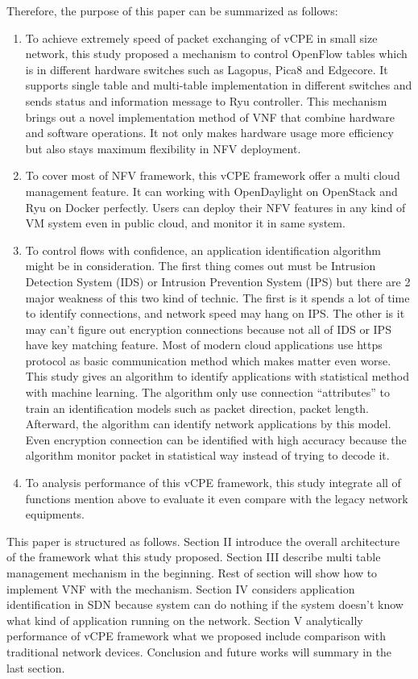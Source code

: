\documentclass[journal]{IEEEtran}
\begin{document}
Therefore, the purpose of this paper can be summarized as follows:
\begin{enumerate}
\item To achieve extremely speed of packet exchanging of vCPE in small size network, this study proposed a mechanism to control OpenFlow tables which is in different hardware switches such as Lagopus, Pica8 and Edgecore. It supports single table and multi-table implementation in different switches and sends status and information message to Ryu controller. This mechanism brings out a novel implementation method of VNF that combine hardware and software operations. It not only makes hardware usage more efficiency but also stays maximum flexibility in NFV deployment.

\item To cover most of NFV framework, this vCPE framework offer a multi cloud management feature. It can working with OpenDaylight\cite{opendaylight} on OpenStack\cite{openstack} and Ryu\cite{web:ryu} on Docker\cite{docker} perfectly. Users can deploy their NFV features in any kind of VM system even in public cloud, and monitor it in same system.
\item To control flows with confidence, an application identification algorithm might be in consideration. The first thing comes out must be Intrusion Detection System (IDS) or Intrusion Prevention System (IPS) but there are 2 major weakness of this two kind of technic. The first is it spends a lot of time to identify connections, and network speed may hang on IPS. The other is it may can’t figure out encryption connections because not all of IDS or IPS have key matching feature. Most of modern cloud applications use https protocol as basic communication method which makes matter even worse. This study gives an algorithm to identify applications with statistical method with machine learning. The algorithm only use connection “attributes” to train an identification models such as packet direction, packet length. Afterward, the algorithm can identify network applications by this model. Even encryption connection can be identified with high accuracy because the algorithm monitor packet in statistical way instead of trying to decode it.
\item To analysis performance of this vCPE framework, this study integrate all of functions mention above to evaluate it even compare with the legacy network equipments.
\end{enumerate}

This paper is structured as follows. Section II introduce the overall architecture of the framework what this study proposed. Section III describe multi table management mechanism in the beginning. Rest of section will show how to implement VNF with the mechanism. Section IV considers application identification in SDN because system can do nothing if the system doesn’t know what kind of application running on the network. Section V analytically performance of vCPE framework what we proposed include comparison with traditional network devices. Conclusion and future works will summary in the last section.
\end{document}
